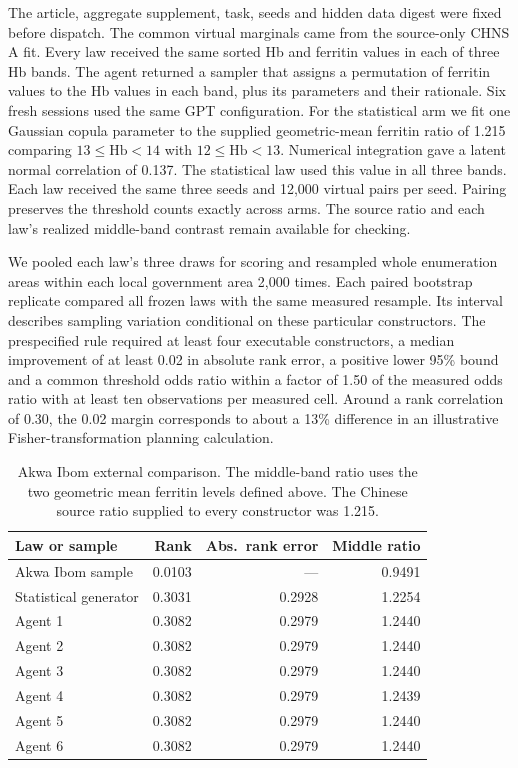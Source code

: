 The article, aggregate supplement, task, seeds and hidden data digest were fixed before dispatch. The common virtual marginals came from the source-only CHNS A fit. Every law received the same sorted Hb and ferritin values in each of three Hb bands. The agent returned a sampler that assigns a permutation of ferritin values to the Hb values in each band, plus its parameters and their rationale. Six fresh sessions used the same GPT configuration. For the statistical arm we fit one Gaussian copula parameter to the supplied geometric-mean ferritin ratio of 1.215 comparing $13\leq\mathrm{Hb}<14$ with $12\leq\mathrm{Hb}<13$. Numerical integration gave a latent normal correlation of 0.137. The statistical law used this value in all three bands. Each law received the same three seeds and 12,000 virtual pairs per seed. Pairing preserves the threshold counts exactly across arms. The source ratio and each law's realized middle-band contrast remain available for checking.

We pooled each law's three draws for scoring and resampled whole enumeration areas within each local government area 2,000 times. Each paired bootstrap replicate compared all frozen laws with the same measured resample. Its interval describes sampling variation conditional on these particular constructors. The prespecified rule required at least four executable constructors, a median improvement of at least 0.02 in absolute rank error, a positive lower 95\% bound and a common threshold odds ratio within a factor of 1.50 of the measured odds ratio with at least ten observations per measured cell. Around a rank correlation of 0.30, the 0.02 margin corresponds to about a 13\% difference in an illustrative Fisher-transformation planning calculation.

\begin{table}[t]
\caption{Akwa Ibom external comparison. The middle-band ratio uses the two geometric mean ferritin levels defined above. The Chinese source ratio supplied to every constructor was 1.215.}
\label{tab:akwa}
\centering\small
\begin{tabular}{@{}lrrr@{}}
\toprule
Law or sample & Rank & Abs.\ rank error & Middle ratio\\
\midrule
Akwa Ibom sample & 0.0103 & --- & 0.9491\\
Statistical generator & 0.3031 & 0.2928 & 1.2254\\
Agent 1 & 0.3082 & 0.2979 & 1.2440\\
Agent 2 & 0.3082 & 0.2979 & 1.2440\\
Agent 3 & 0.3082 & 0.2979 & 1.2440\\
Agent 4 & 0.3082 & 0.2979 & 1.2439\\
Agent 5 & 0.3082 & 0.2979 & 1.2440\\
Agent 6 & 0.3082 & 0.2979 & 1.2440\\
\bottomrule
\end{tabular}
\end{table}

